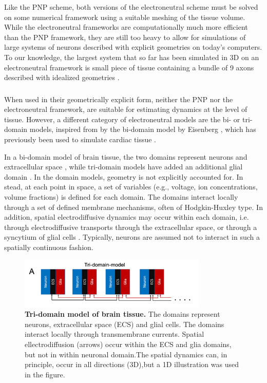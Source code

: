 Like the PNP scheme, both versions of the electroneutral scheme must be solved on some numerical framework using a suitable meshing of the tissue volume. While the electroneutral frameworks are computationally much more efficient than the PNP framework, they are still too heavy to allow for simulations of large systems of neurons described with explicit geometries on today's computers. To our knowledge, the largest system that so far has been simulated in 3D on an electroneutral framework is small piece of tissue containing a bundle of 9 axons described with idealized geometries \cite{ellingsrud2020}.


\subsubsection{}
\label{sec:Schemes:domain}
When used in their geometrically explicit form, neither the PNP nor the electroneutral framework, are suitable for estimating dynamics at the level of tissue. However, a different category of electroneutral models are the bi- or tri-domain models, inspired from by the bi-domain model by Eisenberg \cite{eisenberg1970}, which has previously been used to simulate cardiac tissue \cite{henriquez1993, sundnes2006, Mori2008}. 

In a bi-domain model of brain tissue, the two domains represent neurons and extracellular space \cite{Mori2015}, while tri-domain models have added an additional glial domain \cite{OConnell2016, tuttle2019}. In the domain models, geometry is not explicitly accounted for. In stead, at each point in space, a set of variables (e.g., voltage, ion concentrations, volume fractions) is defined for each domain. The domains interact locally through a set of defined membrane mechanisms, often of Hodgkin-Huxley type. In addition, spatial electrodiffusive dynamics may occur within each domain, i.e. through electrodiffusive transports through the extracellular space\cite{Mori2015, OConnell2016, tuttle2019}, or through a syncytium of glial cells \cite{OConnell2016, tuttle2019}. Typically, neurons are assumed not to interact in such a spatially
continuous fashion. 

\begin{figure}[!ht]
\begin{center}
\includegraphics[width=0.8\textwidth]{Figures/Schemes/Tridomain.png}
\end{center}
\caption{\textbf{Tri-domain model of brain tissue.} The domains represent neurons, extracellular space (ECS) and glial cells. The domains interact locally through transmembrane currents. Spatial ellectrodiffusion (arrows) occur within the ECS and glia domains, but not in within neuronal domain.The spatial dynamics can, in principle, occur in all directions (3D),but a 1D illustration was used in the figure. 
}
\label{Schemes:fig:domainmodel}
\end{figure}

